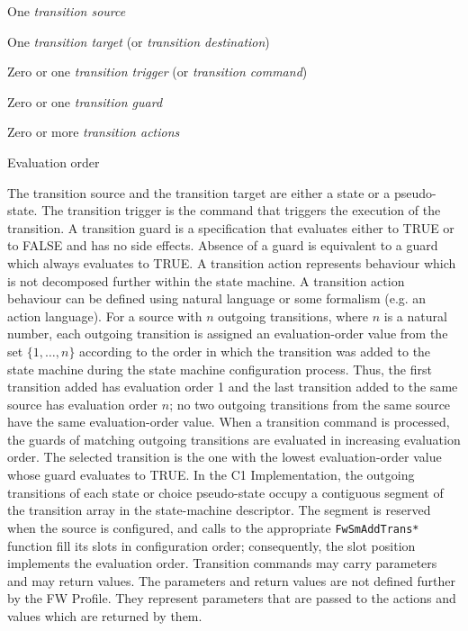 \begin{fw_itemize}
\item One \emph{transition source}
\item One \emph{transition target} (or \emph{transition destination})
\item Zero or one \emph{transition trigger} (or \emph{transition command})
\item Zero or one \emph{transition guard}
\item Zero or more \emph{transition actions}
\item Evaluation order
\end{fw_itemize}

The transition source and the transition target are either a state or a pseudo-state. The transition trigger is the command that triggers the execution 
of the transition. A transition guard is a specification that evaluates either to TRUE or to FALSE and has no side effects. Absence of a guard is equivalent to a guard which always evaluates to TRUE. A transition action represents 
behaviour which is not decomposed further within the state machine. A transition action behaviour can be defined using natural language or some formalism 
(e.g. an action language). For a source with $n$ outgoing transitions, where $n$ is a natural number, each outgoing transition is assigned an evaluation-order value
from the set $\{1,\ldots,n\}$ according to the order in which the transition was added to the state machine during the state machine configuration process.
Thus, the first transition added has evaluation order 1 and the last transition added to the same source has evaluation order $n$; no two outgoing transitions from the same source
have the same evaluation-order value. When a transition command is processed, the guards of matching outgoing transitions are evaluated in increasing evaluation order.
The selected transition is the one with the lowest evaluation-order value whose guard evaluates to TRUE. In the C1 Implementation, the outgoing transitions of each
state or choice pseudo-state occupy a contiguous segment of the transition array in the state-machine descriptor. The segment is reserved when the source is configured,
and calls to the appropriate \texttt{FwSmAddTrans*} function fill its slots in configuration order; consequently, the slot position implements the evaluation order.
Transition commands may carry parameters and may return values. The parameters and return values are not defined further by the
FW Profile. They represent parameters that are passed to the actions and values which are returned by them. 

